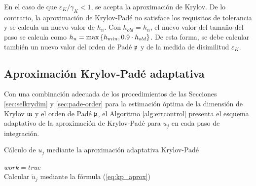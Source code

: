 En el caso de que $\varepsilon_{K}/\gamma_K< 1$, se acepta la aproximación de Krylov. De lo contrario, la aproximación de Krylov-Padé no satisface los requisitos de tolerancia y se calcula un nuevo valor de $h_n$. Con $h_{old}=h_n$, el nuevo valor del tamaño del paso se calcula como $h_n=\max\left\{ h_{min},0.9\cdot h_{old} \right\}$. De esta forma, se debe calcular también un nuevo valor del orden de Padé $\mathfrak{p}$ y de la medida de disimilitud $\varepsilon_{K}$.

\subsection{Aproximación Krylov-Padé adaptativa}\label{secc:krylov-Pade}
Con una combinación adecuada de los procedimientos de las Secciones \ref{sec:selkrydim} y \ref{sec:pade-order} para la estimación óptima de la dimensión de Krylov $\mathfrak{m}$ y el orden de Padé $\mathfrak{p}$, el Algoritmo \ref{alg:errcontrol} presenta el esquema adaptativo de la aproximación de Krylov-Padé para $u_j$ en cada paso de integración.

{\SetAlgoNoLine
\begin{algorithm}[!htb]
	\caption{Cálculo de $u_j$ mediante la aproximación adaptativa Krylov-Padé}
	\label{alg:errcontrol}
	$work=true$\\
	Calcular $\widetilde{u}_j$ mediante la fórmula (\ref{eq:kp_aprox})\\
\end{algorithm}}

